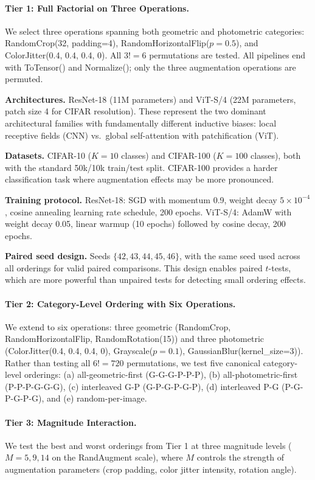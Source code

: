 \documentclass{article}
\begin{document}
\paragraph{Tier 1: Full Factorial on Three Operations.}
We select three operations spanning both geometric and photometric categories: RandomCrop(32, padding=4), RandomHorizontalFlip($p=0.5$), and ColorJitter(0.4, 0.4, 0.4, 0). All $3! = 6$ permutations are tested. All pipelines end with ToTensor() and Normalize(); only the three augmentation operations are permuted.

\textbf{Architectures.} ResNet-18 (11M parameters) and ViT-S/4 (22M parameters, patch size 4 for CIFAR resolution). These represent the two dominant architectural families with fundamentally different inductive biases: local receptive fields (CNN) vs.\ global self-attention with patchification (ViT).

\textbf{Datasets.} CIFAR-10 ($K=10$ classes) and CIFAR-100 ($K=100$ classes), both with the standard 50k/10k train/test split. CIFAR-100 provides a harder classification task where augmentation effects may be more pronounced.

\textbf{Training protocol.} ResNet-18: SGD with momentum 0.9, weight decay $5 \times 10^{-4}$, cosine annealing learning rate schedule, 200 epochs. ViT-S/4: AdamW with weight decay 0.05, linear warmup (10 epochs) followed by cosine decay, 200 epochs.

\textbf{Paired seed design.} Seeds $\{42, 43, 44, 45, 46\}$, with the same seed used across all orderings for valid paired comparisons. This design enables paired $t$-tests, which are more powerful than unpaired tests for detecting small ordering effects.

\paragraph{Tier 2: Category-Level Ordering with Six Operations.}
We extend to six operations: three geometric (RandomCrop, RandomHorizontalFlip, RandomRotation(15)) and three photometric (ColorJitter(0.4, 0.4, 0.4, 0), Grayscale($p=0.1$), GaussianBlur(kernel\_size=3)). Rather than testing all $6! = 720$ permutations, we test five canonical category-level orderings: (a) all-geometric-first (G-G-G-P-P-P), (b) all-photometric-first (P-P-P-G-G-G), (c) interleaved G-P (G-P-G-P-G-P), (d) interleaved P-G (P-G-P-G-P-G), and (e) random-per-image.

\paragraph{Tier 3: Magnitude Interaction.}
We test the best and worst orderings from Tier 1 at three magnitude levels ($M = 5, 9, 14$ on the RandAugment scale), where $M$ controls the strength of augmentation parameters (crop padding, color jitter intensity, rotation angle).
\end{document}

